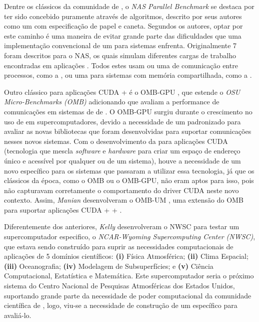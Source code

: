 Dentre os \benchs clássicos da comunidade de \HPC, o \textit{NAS Parallel Benchmark} \cite{baileynasbench} se destaca por ter sido concebido puramente através de algoritmos, descrito por seus autores como um \bench com especificação de papel e caneta. Segundos os autores, optar por este caminho é uma maneira de evitar grande parte das dificuldades que uma implementação convencional de um \bench para sistemas \HPC enfrenta. Originalmente 7  foram descritos para o NAS, os quais simulam diferentes cargas de trabalho encontradas em aplicações \HPC. Todos estes  usam ou uma \API de comunicação entre processos, como a \MPI, ou uma \API para sistemas com memória compartilhada, como a \OpenMP.

Outro \bench clássico para aplicações CUDA + \MPI é o OMB-GPU \cite{bureddyomb}, que estende o \textit{OSU Micro-Benchmarks (OMB)} adicionando  que avaliam a performance de comunicações \MPI em sistemas de \clusters de \GPUs. O OMB-GPU surgiu durante o crescimento no uso de \GPUs em supercomputadores, devido a necessidade de um \bench padronizado para avaliar as novas bibliotecas \MPI que foram desenvolvidas para suportar comunicações \MPI nesses novos sistemas. Com o desenvolvimento da \UM para aplicações CUDA (tecnologia que mescla \textit{software} e \textit{hardware} para criar um espaço de endereço único e acessível por qualquer \GPU ou \CPU de um sistema), houve a necessidade de um novo \bench específico para os sistemas que passaram a utilizar essa tecnologia, já que os \benchs clássicos da época, como o OMB ou o OMB-GPU, não eram aptos para isso, pois não capturavam corretamente o comportamento do driver CUDA neste novo contexto. Assim, \textit{Manian} \etal desenvolveram o OMB-UM \cite{maniancudaum}, uma extensão do OMB para suportar aplicações CUDA + \MPI + \UM.

Diferentemente dos \benchs anteriores, \textit{Kelly} \etal \cite{kellynwsc} desenvolveram o \bench NWSC para testar um supercomputador especifico, o \textit{NCAR-Wyoming Supercomputing Center (NWSC)}, que estava sendo construído para suprir as necessidades computacionais de aplicações \HPC de 5 domínios científicos: \textbf{(i)} Física Atmosférica; \textbf{(ii)} Clima Espacial; \textbf{(iii)} Oceanografia; \textbf{(iv)} Modelagem de Subsuperfícies; e \textbf{(v)} Ciência Computacional, Estatística e Matemática. Este supercomputador seria o próximo sistema \HPC do Centro Nacional de Pesquisas Atmosféricas dos Estados Unidos, suportando grande parte da necessidade de poder computacional da comunidade científica de \HPC, logo, viu-se a necessidade de construção de um \bench específico para avaliá-lo.

